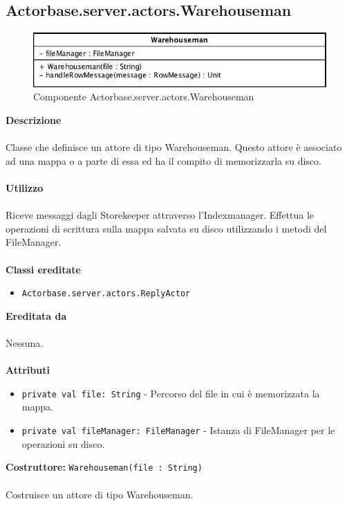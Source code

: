 \documentclass[a4paper]{article}
\begin{document}
			
	\subsection{Actorbase.server.actors.Warehouseman}
		\begin{figure}[H]
			\centering
			\includegraphics[scale = 0.6]{Server/warehouseman.jpg}
			\caption{Componente Actorbase.server.actors.Warehouseman}
		\end{figure}
		\textbf{Descrizione}
			\\ \\
			Classe che definisce un attore di tipo Warehouseman. Questo attore è associato ad una mappa o a parte di essa ed ha il compito di memorizzarla su disco.
			\\ \\
		\textbf{Utilizzo}
			\\ \\
			Riceve messaggi dagli Storekeeper attraverso l'Indexmanager. Effettua le operazioni di scrittura sulla mappa salvata su disco utilizzando i metodi del FileManager.
			\\ \\
		\textbf{Classi ereditate}
			\begin{itemize}
				\item \texttt{Actorbase.server.actors.ReplyActor}
			\end{itemize}
		\textbf{Ereditata da}
			\\ \\
			Nessuna.
			\\ \\
		\textbf{Attributi}
			\begin{itemize}
				\item \texttt{private val file: String} - Percorso del file in cui è memorizzata la mappa.
				\item \texttt{private val fileManager: FileManager}	- Istanza di FileManager per le operazioni su disco.
			\end{itemize}
		\textbf{Costruttore: }\texttt{Warehouseman(file : String)}
			\\ \\
		Costruisce un attore di tipo Warehouseman. 
\end{document}
